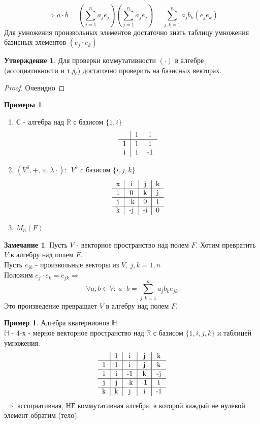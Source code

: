 \documentclass[a4paper, 12pt]{article}
\newcommand{\R}{\mathbb R}
\newcommand\tab[1][.5cm]{\hspace*{#1}}
\theoremstyle{definition}
\newtheorem*{subtheorem}{Утверждение}
\newtheorem*{remark}{Замечание}
\newtheorem*{example}{Примеры}
\newtheorem*{example1}{Пример}
\begin{document}
  $$\Longrightarrow a \cdot b = (\sum \limits_{j=1}^na_je_j)(\sum \limits_{j=1}^na_je_j) = \sum \limits_{j,k=1}^na_jb_k(e_je_k)$$ 
  Для умножения произвольных элементов достаточно знать таблицу умножения базисных элементов $(e_j \cdot e_k)$ 
  \begin{subtheorem}
    Для проверки коммутативности $(\cdot)$ в алгебре (ассоциативности и т.д.) достаточно проверить на базисных векторах. 
  \end{subtheorem} 
  \begin{proof}
    Очевидно
  \end{proof}
  \begin{example}\tab
    \begin{enumerate}
      \item $\mathbb{C}$ - алгебра над $\R$ с базисом $\{1, i\}$
      $$\begin{tabular}{c|cc}
        \null & 1 & i \\ \hline
        1 & 1 & i \\
        i & i & -1
      \end{tabular}$$
      \item $(V^3, +, \times, \lambda \cdot); \  \ V^3$ c базисом $\{i, j, k\}$
      $$\begin{tabular}{c|c|c|c}
        x & i & j & k \\ \hline
        i & 0 & k & j \\ \hline
        j & -k & 0 & i \\ \hline
        k & -j & -i & 0
      \end{tabular}$$
      \item $M_n(F)$
    \end{enumerate}
  \end{example}
  \begin{remark}
    Пусть $V$ - векторное пространство над полем $F$.
  Хотим превратить $V$ в алгебру над полем $F$. \\
  Пусть $e_{jk}$ - произвольные векторы из $V, \ j,k = \overline{1, n}$ \\
  Положим $e_j \cdot e_k = e_{jk} \Longrightarrow $ $$\forall a, b\in V: \ a\cdot b=\sum \limits_{j,k=1}^na_jb_ke_{jk}$$
  Это произведение превращает $V$ в алгебру над полем $F$.  
  \end{remark} 
  \begin{example1}
    Алгебра кватернионов $\mathbb{H}$ \\
    $\mathbb{H}$ - 4-х - мерное векторное пространство над $\R$ с базисом $\{1, i, j, k\}$ и таблицей умножения:
    $$\begin{tabular}{c|c|c|c|c}
        \null & 1 & i & j & k \\ \hline
        1 & 1 & i & j & k \\ \hline
        i & i & -1 & k & -j \\ \hline
        j & j & -k & -1 & i \\ \hline
        k & k & j & i & -1
      \end{tabular}$$
      $\Longrightarrow $ ассоциативная, НЕ коммутативная алгебра, в которой каждый не нулевой элемент обратим (тело).  
  \end{example1}
\end{document}
